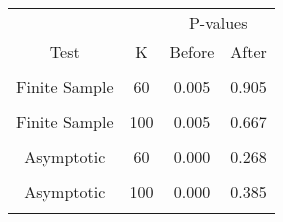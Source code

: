 \begin{table}[!h]
\centering
\begin{tabular}{cccc}
\toprule
\multicolumn{1}{c}{ } & \multicolumn{1}{c}{ } & \multicolumn{2}{c}{P-values} \\
\cmidrule(l{3pt}r{3pt}){3-4}
Test & K & Before & After\\
\midrule
\cellcolor{gray!6}{Finite Sample} & \cellcolor{gray!6}{40} & \cellcolor{gray!6}{0.005} & \cellcolor{gray!6}{0.841}\\
Finite Sample & 60 & 0.005 & 0.905\\
\cellcolor{gray!6}{Finite Sample} & \cellcolor{gray!6}{80} & \cellcolor{gray!6}{0.005} & \cellcolor{gray!6}{0.726}\\
Finite Sample & 100 & 0.005 & 0.667\\
\cellcolor{gray!6}{Asymptotic} & \cellcolor{gray!6}{40} & \cellcolor{gray!6}{0.000} & \cellcolor{gray!6}{0.198}\\
\addlinespace
Asymptotic & 60 & 0.000 & 0.268\\
\cellcolor{gray!6}{Asymptotic} & \cellcolor{gray!6}{80} & \cellcolor{gray!6}{0.000} & \cellcolor{gray!6}{0.320}\\
Asymptotic & 100 & 0.000 & 0.385\\
\cellcolor{gray!6}{ECE} & \cellcolor{gray!6}{} & \cellcolor{gray!6}{0.254} & \cellcolor{gray!6}{0.119}\\
\bottomrule
\end{tabular}
\end{table}
